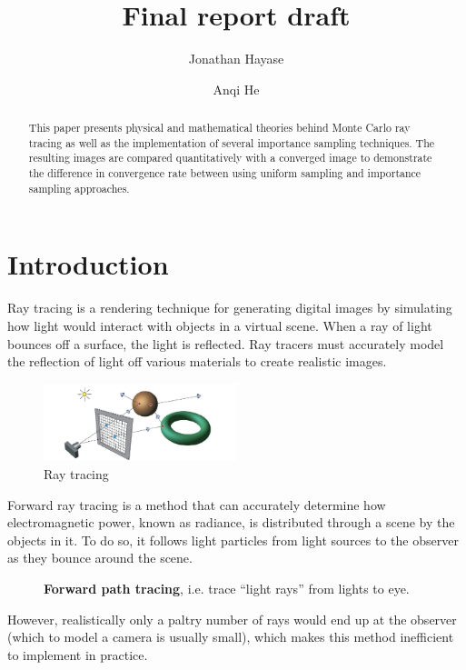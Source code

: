 \documentclass[12pt]{article}
\title{Final report draft}
\author{Jonathan Hayase\and Anqi He}
\begin{document}
\maketitle
\begin{abstract}\noindent
  This paper presents physical and mathematical theories behind Monte Carlo ray tracing as well as the implementation of several importance sampling techniques.
  The resulting images are compared quantitatively with a converged image to demonstrate the difference in convergence rate between using uniform sampling and importance sampling approaches.
\end{abstract}

\section{Introduction}
Ray tracing is a rendering technique for generating digital images by simulating how light would interact with objects in a virtual scene.
When a ray of light bounces off a surface, the light is reflected.
Ray tracers must accurately model the reflection of light off various materials to create realistic images.
\begin{figure}[ht]
  \centering
    \includegraphics[width=0.5\textwidth]{figure1.png}
    \caption{Ray tracing}
\end{figure}
Forward ray tracing is a method that can accurately determine how electromagnetic power, known as radiance, is distributed through a scene by the objects in it.
To do so, it follows light particles from light sources to the observer as they bounce around the scene.
\begin{figure}[H]
  \centering
  \caption{\textbf{Forward path tracing}, i.e. trace ``light rays'' from lights to eye.}
\end{figure}
However, realistically only a paltry number of rays would end up at the observer (which to model a camera is usually small), which makes this method inefficient to implement in practice.
\end{document}
